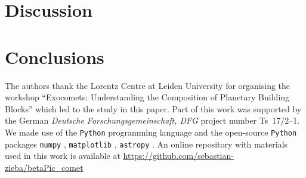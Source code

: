 \documentclass{aa}
\begin{document}
\section{Discussion}

\section{Conclusions}


\begin{acknowledgements}

      The authors thank the Lorentz Centre at Leiden University for organising the workshop ``Exocomets: Understanding the Composition of Planetary Building Blocks'' which led to the study in this paper. 
%
      Part of this work was supported by the German
      \emph{Deut\-sche For\-schungs\-ge\-mein\-schaft, DFG\/} project
      number Ts~17/2--1.
We made use of the {\tt Python} programming language \citep{rossum1995} and the open-source {\tt Python} packages {\tt numpy} \citep{walt2011}, {\tt matplotlib} \citep{hunter2007}, {\tt astropy} \citep{astropy2013}.
%      
An online repository with materials used in this work is available at \url{https://github.com/sebastian-zieba/betaPic_comet}
\end{acknowledgements}











   
  


\end{document}
